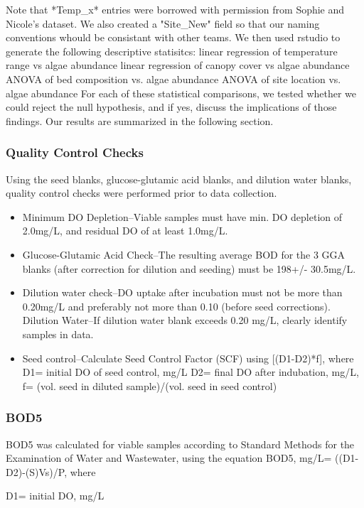 \documentclass{article}\usepackage[]{graphicx}\usepackage[]{color}
\begin{document}
Note that *Temp\_x* entries were borrowed with permission from Sophie and Nicole's dataset. We also created a "Site\_New" field so that our naming conventions whould be consistant with other teams. We then used rstudio to generate the following descriptive statisitcs:  
linear regression of temperature range vs algae abundance
linear regression of canopy cover vs algae abundance
ANOVA of bed composition vs. algae abundance
ANOVA of site location vs. algae abundance
For each of these statistical comparisons, we tested whether we could reject the null hypothesis, and if yes, discuss the implications of those findings. Our results are summarized in the following section. 

\subsubsection*{Quality Control Checks}
Using the seed blanks, glucose-glutamic acid blanks, and dilution water blanks, quality control checks were performed prior to data collection. 
\begin{itemize}
  \item Minimum DO Depletion--Viable samples must have min. DO depletion of 2.0mg/L, and residual DO of at least 1.0mg/L.
  \item Glucose-Glutamic Acid Check--The resulting average BOD for the 3 GGA blanks (after correction for dilution and seeding) must be 198+/- 30.5mg/L.
  \item Dilution water check--DO uptake after incubation must not be more than 0.20mg/L and preferably not more than 0.10 (before seed corrections). 
  \subitem Dilution Water--If dilution water blank exceeds 0.20 mg/L, clearly identify samples in data.
  \item Seed control--Calculate Seed Control Factor (SCF) using [(D1-D2)*f], where
  \subitem D1= initial DO of seed control, mg/L
  \subitem D2= final DO after indubation, mg/L,
  \subitem f= (vol. seed in diluted sample)/(vol. seed in seed control)
\end{itemize}

\subsubsection*{BOD5}
BOD5 was calculated for viable samples according to Standard Methods for the Examination of Water and Wastewater, using the equation 
BOD5, mg/L= ((D1-D2)-(S)Vs)/P, where 


D1= initial DO, mg/L
\end{document}

